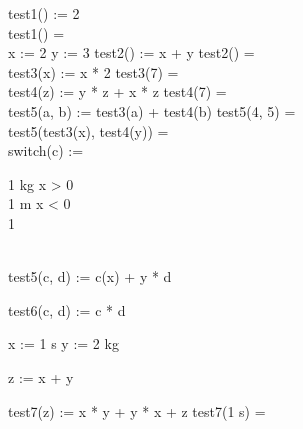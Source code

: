 

    \begin{preproc}


        test1() := 2 \\
        test1() = \placeholder{} \\

        x := 2
        y := 3
        test2() := x + y
        test2() = \placeholder{} \\

        test3(x) := x * 2
        test3(7) = \placeholder{} \\

        test4(z) := y * z + x * z
        test4(7) = \placeholder{} \\

        test5(a, b) := test3(a) + test4(b)
        test5(4, 5) = \placeholder{} \\
        test5(test3(x), test4(y)) = \placeholder{} \\

        switch(c) := \begin{caseblock}
                         1 \cdot kg \when x > 0 \\
                         1 \cdot m \when x < 0 \\
                         1 \otherwise
        \end{caseblock} \\ %


        test5(c, d) := c(x) + y * d %

        test6(c, d) := c * d %

        x := 1 \cdot s
        y := 2 \cdot kg

        z := x + y %

        test7(z) := x * y + y * x + z %
        test7(1 \cdot s) = \placeholder{} \\ %

    \end{preproc}



